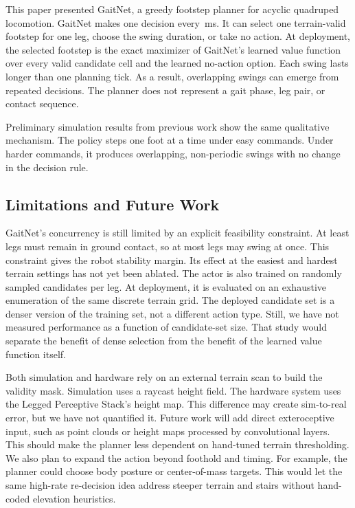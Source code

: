 This paper presented GaitNet, a greedy footstep planner for acyclic
quadruped locomotion. GaitNet makes one decision every
\corlControlTickMs\,ms. It can select one terrain-valid footstep for
one leg, choose the swing duration, or take no action.
At deployment, the selected footstep is the exact maximizer
of GaitNet's learned value function over every valid candidate cell
and the learned no-action option. Each swing lasts longer than one
planning tick. As a result, overlapping swings can emerge from
repeated decisions. The planner does not represent a gait phase, leg
pair, or contact sequence.

 Preliminary simulation results from previous work
\cite{Sullivan2025} show the same qualitative mechanism.
The policy steps one foot at a time under easy commands. Under harder
commands, it produces overlapping, non-periodic swings with no change
in the decision rule. 

\subsection{Limitations and Future Work}

GaitNet's concurrency is still limited by an explicit feasibility
constraint. At least \numberstringnum{\corlMinContactLegs} legs must
remain in ground contact, so at most
\numberstringnum{\corlMaxConcurrentSwingLegs} legs may swing at once.
This constraint gives the robot stability margin. Its effect at the
easiest and hardest terrain settings has not yet been ablated.
The actor is also trained on
\numberstringnum{\corlTrainCandidatesPerLeg} randomly sampled
candidates per leg. At deployment, it is evaluated on an exhaustive
enumeration of the same discrete terrain grid. The deployed candidate
set is a denser version of the training set, not a different action
type. Still, we have not measured performance as a function of
candidate-set size. That study would separate the benefit of dense
selection from the benefit of the learned value function itself.

Both simulation and hardware rely on an external terrain scan to build
the validity mask. Simulation uses a raycast height field. The
hardware system uses the Legged Perceptive Stack's height map. This
difference may create sim-to-real error, but we have not quantified
it. Future work will add direct exteroceptive input, such as point
clouds or height maps processed by convolutional layers. This should
make the planner less dependent on hand-tuned terrain thresholding. We
also plan to expand the action beyond foothold and timing. For
example, the planner could choose body posture or center-of-mass
targets. This would let the same high-rate re-decision idea address
steeper terrain and stairs without hand-coded elevation heuristics.
